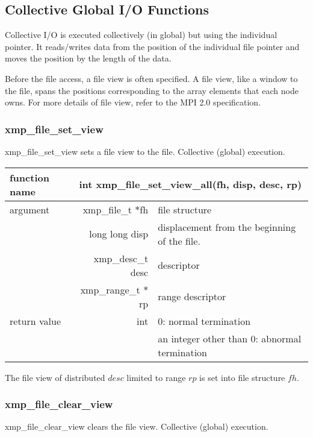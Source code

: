    \subsection{Collective Global I/O Functions}

   Collective I/O is executed collectively (in global) but using the individual pointer.
   It reads/writes data from the position of the individual file pointer and moves the position
   by the length of the data.

   Before the file access, a file view is often specified. A file view, like a window to the file, 
   spans the positions corresponding to the array elements that each node owns. 
   For more details of file view, refer to the MPI 2.0 specification.

   \subsubsection{xmp\_file\_set\_view}
   xmp\_file\_set\_view sets a file view to the file. Collective (global) execution.

   \begin{table}[h]
    \begin{center}
     \begin{tabular}{|l|r|p{70mm}|}
      \hline
      {\bf function name}  & \multicolumn{2}{c|}{\bf int xmp\_file\_set\_view\_all(fh,
      disp, desc, rp)} \\ \hline \hline
      argument & xmp\_file\_t $*$fh & file structure \\ \cline{2-3}
      & long long disp & displacement from the beginning of the file. \\ \cline{2-3}
      & xmp\_desc\_t desc & descriptor \\ \cline{2-3}
      & xmp\_range\_t $*$rp & range descriptor \\ \hline
      return value & int & 0: normal termination \\
      &  & an integer other than 0: abnormal termination \\ \hline
      \end{tabular}
     \end{center}
    \label{tb:aaa}
   \end{table}

   The file view of distributed $desc$ limited to range $rp$ is set into file structure $fh$.

   \subsubsection{xmp\_file\_clear\_view}
   xmp\_file\_clear\_view clears the file view. Collective (global) execution.


